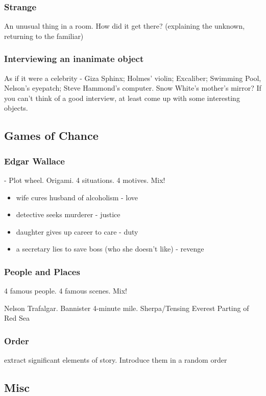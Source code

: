 \documentclass[11pt]{article}
\begin{document}
\subsubsection*{Strange}
An unusual thing in a room. How did it get there? (explaining the unknown, returning to the familiar)


\subsubsection*{Interviewing an inanimate object}
As if it were a celebrity - Giza Sphinx; Holmes' violin; Excaliber; Swimming Pool, Nelson's eyepatch; Steve Hammond's computer. Snow White's mother's mirror? If you can't think of a good interview, at least come up with some interesting objects.



\subsection*{Games of Chance}


\subsubsection*{Edgar Wallace} - Plot wheel. Origami. 4 situations. 4 motives. Mix!
\begin{itemize}
\item wife cures husband of alcoholism - love
\item detective seeks murderer - justice
\item daughter gives up career to care - duty
\item a secretary lies to save boss (who she doesn't like) - revenge
\end{itemize}

\subsubsection*{People and Places}
4 famous people. 4 famous scenes. Mix!

Nelson Trafalgar. Bannister 4-minute mile. Sherpa/Tensing Everest
Parting of Red Sea


\subsubsection*{Order}
extract significant elements of story. Introduce them in a random order




\subsection*{Misc}
\end{document}
